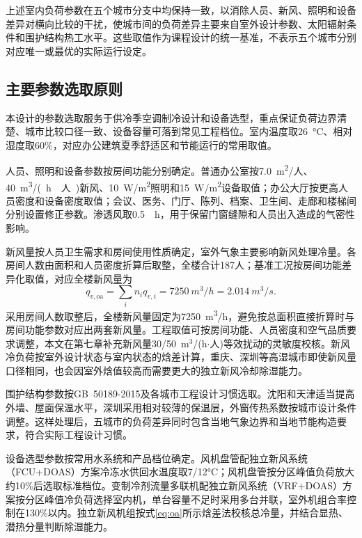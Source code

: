 上述室内负荷参数在五个城市分支中均保持一致，以消除人员、新风、照明和设备差异对横向比较的干扰，使城市间的负荷差异主要来自室外设计参数、太阳辐射条件和围护结构热工水平。这些取值作为课程设计的统一基准，不表示五个城市分别对应唯一或最优的实际运行设定。

\subsection{主要参数选取原则}

本设计的参数选取服务于供冷季空调制冷设计和设备选型，重点保证负荷边界清楚、城市比较口径一致、设备容量可落到常见工程档位。室内温度取\SI{26}{\degreeCelsius}、相对湿度取60\%，对应办公建筑夏季舒适区和节能运行的常用取值。

人员、照明和设备参数按房间功能分别确定。普通办公室按\SI{7.0}{m^2}/人、\SI{40}{m^3/(h\cdot 人)}新风、\SI{10}{W/m^2}照明和\SI{15}{W/m^2}设备取值；办公大厅按更高人员密度和设备密度取值；会议、医务、门厅、陈列、档案、卫生间、走廊和楼梯间分别设置修正参数。渗透风取\SI{0.5}{\per\hour}，用于保留门窗缝隙和人员出入造成的气密性影响。

新风量按人员卫生需求和房间使用性质确定，室外气象主要影响新风处理冷量。各房间人数由面积和人员密度折算后取整，全楼合计187人；基准工况按房间功能差异化取值，对应全楼新风量为
\begin{equation}
q_{v,\mathrm{oa}}=\sum_i n_i q_{v,i}=\SI{7250}{m^3/h}=\SI{2.014}{m^3/s}.
\label{eq:oa-flow}
\end{equation}
采用房间人数取整后，全楼新风量固定为\SI{7250}{m^3/h}，避免按总面积直接折算时与房间功能参数对应出两套新风量。工程取值可按房间功能、人员密度和空气品质要求调整，本文在第七章补充新风量30/50~m$^3$/(h$\cdot$人)等效扰动的灵敏度校核。新风冷负荷按室外设计状态与室内状态的焓差计算，重庆、深圳等高湿城市即使新风量口径相同，也会因室外焓值较高而需要更大的独立新风冷却除湿能力。

围护结构参数按GB~50189-2015及各城市工程设计习惯选取。沈阳和天津适当提高外墙、屋面保温水平，深圳采用相对较薄的保温层，外窗传热系数按城市设计条件调整。这样处理后，五城市的负荷差异同时包含当地气象边界和当地节能构造要求，符合实际工程设计习惯。

设备选型参数按常用水系统和产品档位确定。风机盘管配独立新风系统（FCU+DOAS）方案冷冻水供回水温度取7/12\si{\degreeCelsius}；风机盘管按分区峰值负荷放大约10\%后选取标准档位。变制冷剂流量多联机配独立新风系统（VRF+DOAS）方案按分区峰值冷负荷选择室内机，单台容量不足时采用多台并联，室外机组合率控制在130\%以内。独立新风机组按式\ref{eq:oa}所示焓差法校核总冷量，并结合显热、潜热分量判断除湿能力。

